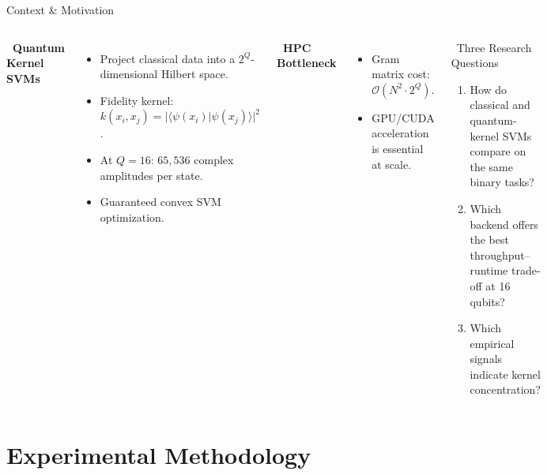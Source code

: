 \documentclass[10pt, aspectratio=169]{beamer}
\begin{document}
\begin{frame}{Context \& Motivation}
    \begin{columns}[T,onlytextwidth]
        \textbf{\faLightbulb\ Quantum Kernel SVMs}
        \begin{itemize}
            \item Project classical data into a $2^Q$-dimensional Hilbert space.
            \item Fidelity kernel: $k(x_i,x_j) = |\langle\psi(x_i)|\psi(x_j)\rangle|^2$.
            \item At $Q=16$: $65{,}536$ complex amplitudes per state.
            \item Guaranteed convex SVM optimization.
        \end{itemize}
        \vspace{0.2cm}
        \textbf{\faExclamationTriangle\ HPC Bottleneck}
        \begin{itemize}
            \item Gram matrix cost: $\mathcal{O}(N^2 \cdot 2^Q)$.
            \item GPU/CUDA acceleration is essential at scale.
        \end{itemize}
        \begin{block}{\faBullseye\ Three Research Questions}
            \begin{enumerate}
                \item How do classical and quantum-kernel SVMs compare on the same binary tasks?
                \item Which backend offers the best throughput--runtime trade-off at 16 qubits?
                \item Which empirical signals indicate kernel concentration?
            \end{enumerate}
        \end{block}
    \end{columns}
\end{frame}

\section{Experimental Methodology}
\end{document}
